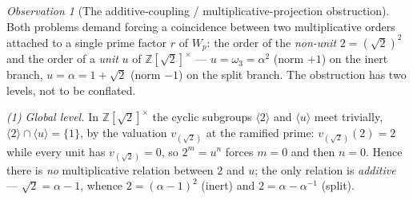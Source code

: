 \documentclass[11pt]{amsart}
\theoremstyle{plain}
\theoremstyle{definition}
\theoremstyle{remark}
\newtheorem{observation}[theorem]{Observation}
\numberwithin{equation}{section}
\newcommand{\Z}{\mathbb{Z}}
\begin{document}
\begin{observation}[The additive-coupling / multiplicative-projection obstruction]\label{obs:additive-multiplicative}
Both problems demand forcing a coincidence between two multiplicative orders attached to a single prime factor $r$ of $W_p$: the order of the \emph{non-unit} $2 = (\sqrt 2)^2$ and the order of a \emph{unit} $u$ of $\Z[\sqrt 2]^\times$ --- $u = \omega_3 = \alpha^2$ (norm $+1$) on the inert branch, $u = \alpha = 1 + \sqrt 2$ (norm $-1$) on the split branch. The obstruction has two levels, not to be conflated.

\emph{(1) Global level.} In $\Z[\sqrt 2]^\times$ the cyclic subgroups $\langle 2 \rangle$ and $\langle u \rangle$ meet trivially, $\langle 2 \rangle \cap \langle u \rangle = \{1\}$, by the valuation $v_{(\sqrt 2)}$ at the ramified prime: $v_{(\sqrt 2)}(2) = 2$ while every unit has $v_{(\sqrt 2)} = 0$, so $2^m = u^n$ forces $m = 0$ and then $n = 0$. Hence there is \emph{no} multiplicative relation between $2$ and $u$; the only relation is \emph{additive} --- $\sqrt 2 = \alpha - 1$, whence $2 = (\alpha - 1)^2$ (inert) and $2 = \alpha - \alpha^{-1}$ (split).


\end{observation}
\end{document}
